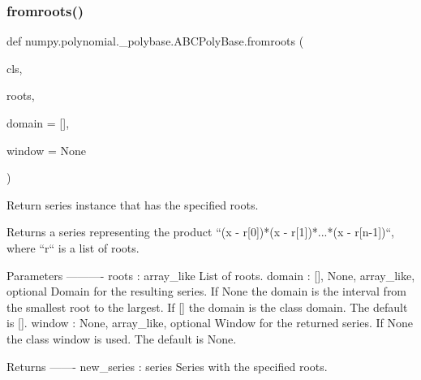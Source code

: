  \mbox{\label{classnumpy_1_1polynomial_1_1__polybase_1_1ABCPolyBase_a3935fad2dd06eb48276cf433d0bc5bed}} 
\subsubsection{\texorpdfstring{fromroots()}{fromroots()}}
{\footnotesize\ttfamily def numpy.\+polynomial.\+\_\+polybase.\+A\+B\+C\+Poly\+Base.\+fromroots (\begin{DoxyParamCaption}\item[{}]{cls,  }\item[{}]{roots,  }\item[{}]{domain = {\ttfamily \mbox{[}\mbox{]}},  }\item[{}]{window = {\ttfamily None} }\end{DoxyParamCaption})}

\begin{DoxyVerb}Return series instance that has the specified roots.

Returns a series representing the product
``(x - r[0])*(x - r[1])*...*(x - r[n-1])``, where ``r`` is a
list of roots.

Parameters
----------
roots : array_like
    List of roots.
domain : {[], None, array_like}, optional
    Domain for the resulting series. If None the domain is the
    interval from the smallest root to the largest. If [] the
    domain is the class domain. The default is [].
window : {None, array_like}, optional
    Window for the returned series. If None the class window is
    used. The default is None.

Returns
-------
new_series : series
    Series with the specified roots.\end{DoxyVerb}
 \mbox{\label{classnumpy_1_1polynomial_1_1__polybase_1_1ABCPolyBase_adefec6d13ec09f96320af218a66ec092}} 
